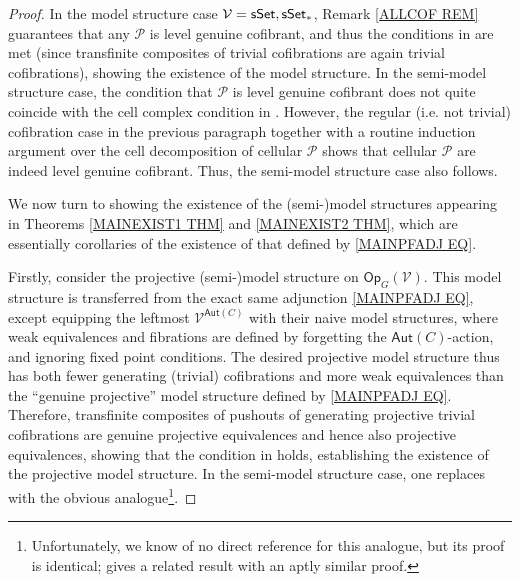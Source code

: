 \documentclass[a4paper,10pt
,draft
]{article}%
\numberwithin{equation}{section}
\numberwithin{figure}{section}
\theoremstyle{definition} %
\renewcommand{\P}{\ensuremath{\mathcal P}}
\newcommand{\1}{\ensuremath{\mathbbm 1}}%
\begin{document}
\begin{proof}
In the model structure case 
$\mathcal{V} = \mathsf{sSet},\mathsf{sSet}_{\**}$,
Remark \ref{ALLCOF REM}
guarantees that any 
$\mathcal{P}$ is level genuine cofibrant,
and thus the conditions in
\cite[Thm. 11.3.2]{Hi03} are met (since transfinite composites of trivial cofibrations are again trivial cofibrations),
showing the existence of the model structure.
In the semi-model structure case, the condition that 
$\mathcal{P}$ is level genuine cofibrant
does not quite coincide with the cell complex condition in \cite[Thm. 2.2.2]{WY18}. 
However, the regular (i.e. not trivial) 
cofibration case in the previous paragraph together with a routine induction argument over the cell decomposition of cellular $\P$ shows that cellular  
$\P$ are indeed level genuine cofibrant.
Thus, the semi-model structure case also follows.

We now turn to showing the existence of the (semi-)model structures appearing in Theorems \ref{MAINEXIST1 THM} and \ref{MAINEXIST2 THM},
which are essentially corollaries 
of the existence of that defined by
\eqref{MAINPFADJ EQ}.

Firstly, consider the projective (semi-)model structure
on $\mathsf{Op}_G(\mathcal{V})$.
This model structure is transferred from the exact same adjunction
\eqref{MAINPFADJ EQ}, except equipping the 
leftmost $\mathcal{V}^{\mathsf{Aut}(C)}$
with their naive model structures, where weak equivalences and fibrations are defined by forgetting the $\mathsf{Aut}(C)$-action,
and ignoring fixed point conditions.
The desired projective model structure thus
has both fewer generating (trivial) cofibrations
and more weak equivalences than the ``genuine projective'' model structure defined by \eqref{MAINPFADJ EQ}.
Therefore, transfinite composites of pushouts of generating projective trivial cofibrations 
are genuine projective equivalences and hence also projective equivalences, showing that the condition in 
\cite[Thm. 11.3.2(2)]{Hi03}
holds,
establishing the existence of the projective model structure. 
In the semi-model structure case,
one replaces \cite[Thm. 11.3.2(2)]{Hi03}
with the obvious analogue\footnote{Unfortunately, we know of no direct reference for this analogue, but its proof is identical; \cite[Thm. 2]{Spi01} gives a related result with an aptly similar proof.}.
%



\end{proof}
\end{document}
